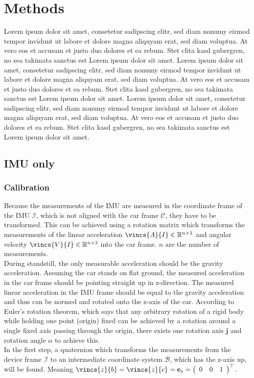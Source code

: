 \chapter{Methods}
\label{ch:Methods}
Lorem ipsum dolor sit amet, consetetur sadipscing elitr, sed diam nonumy eirmod tempor invidunt ut labore et dolore magna aliquyam erat, sed diam voluptua.
At vero eos et accusam et justo duo dolores et ea rebum. Stet clita kasd gubergren, no sea takimata sanctus est Lorem ipsum dolor sit amet.
Lorem ipsum dolor sit amet, consetetur sadipscing elitr, sed diam nonumy eirmod tempor invidunt ut labore et dolore magna aliquyam erat, sed diam voluptua.
At vero eos et accusam et justo duo dolores et ea rebum. Stet clita kasd gubergren, no sea takimata sanctus est Lorem ipsum dolor sit amet.
Lorem ipsum dolor sit amet, consetetur sadipscing elitr, sed diam nonumy eirmod tempor invidunt ut labore et dolore magna aliquyam erat, sed diam voluptua.
At vero eos et accusam et justo duo dolores et ea rebum. Stet clita kasd gubergren, no sea takimata sanctus est Lorem ipsum dolor sit amet.

\section{IMU only}
\subsection{Calibration}
Because the measurements of the IMU are measured in the coordinate frame of the IMU $\mathcal{I}$, which is not aligned with the car frame $\mathcal{C}$, they have to be transformed.
This can be achieved using a rotation matrix  which transforms the measurements of the linear acceleration $\vincs{A}{I} \in \mathbb{R}^{n\times3}$ and angular velocity ${\vincs{V}{I} \in \mathbb{R}^{n\times3}}$ into the car frame. $n$ are the number of measurements.\\
During standstill, the only measurable acceleration should be the gravity acceleration.
Assuming the car stands on flat ground, the measured acceleration in the car frame should be pointing straight up in z-direction.
The measured linear acceleration in the IMU frame should be equal to the gravity acceleration and thus can be normed and rotated onto the z-axis of the car.
According to Euler's rotation theorem, which says that any arbitrary rotation of a rigid body while holding one point (origin) fixed can be achieved by a rotation around a single fixed axis passing through the origin, there exists one rotation axis $\mathbf{j}$ and rotation angle $\alpha$ to achieve this.\\
In the first step, a quaternion  which transforms the measurements from the device frame $\mathcal{I}$ to an intermediate coordinate system $\mathcal{B}$, which has the z-axis up, will be found.
Meaning  $\vincs{z}{b} = \vincs{z}{c} = \mathbf{e}_\mathrm{z} = \left(\begin{array}{lll} 0 & 0 & 1 \end{array}\right)^{\top}$.

